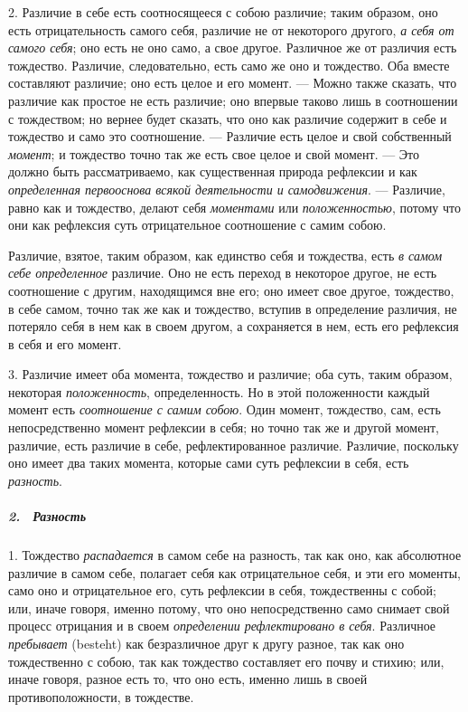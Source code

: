2. Различие в себе есть соотносящееся с собою различие; таким образом, оно
есть отрицательность самого себя, различие не от некоторого другого,
{\em а себя от самого себя}; оно есть не оно само, а
свое другое. Различное же от различия есть тождество. Различие,
следовательно, есть само же оно и тождество. Оба вместе составляют
различие; оно есть целое и его момент. — Можно также сказать, что различие
как простое не есть различие; оно впервые таково лишь в соотношении с
тождеством; но вернее будет сказать, что оно как различие содержит в себе и
тождество и само это соотношение. — Различие есть целое и свой собственный
{\em момент}; и тождество точно так же есть свое целое
и свой момент. — Это должно быть рассматриваемо, как существенная природа
рефлексии и как {\em определенная первооснова всякой
деятельности и самодвижения}. — Различие, равно как и тождество, делают
себя {\em моментами} или
{\em положенностью}, потому что они как рефлексия суть
отрицательное соотношение с самим собою.

Различие, взятое, таким образом, как единство себя и тождества, есть
{\em в самом себе определенное} различие. Оно не есть
переход в некоторое другое, не есть соотношение с другим, находящимся вне
его; оно имеет свое другое, тождество, в себе самом, точно так же как и
тождество, вступив в определение различия, не потеряло себя в нем как в
своем другом, а сохраняется в нем, есть его рефлексия в себя и его момент.

3. Различие имеет оба момента, тождество и различие; оба суть, таким
образом, некоторая {\em положенность}, определенность.
Но в этой положенности каждый момент есть
{\em соотношение с самим собою}. Один момент,
тождество, сам, есть непосредственно момент рефлексии в себя; но точно так
же и другой момент, различие, есть различие в себе, рефлектированное
различие. Различие, поскольку оно имеет два таких момента, которые сами
суть рефлексии в себя, есть {\em разность}.

\subparagraph[2. \ Разность]{2. \ Разность}
1. Тождество {\em распадается} в самом себе на разность, так как
оно, как абсолютное различие в самом себе, полагает себя как отрицательное
себя, и эти его моменты, само оно и отрицательное его, суть рефлексии в
себя, тождественны с собой; или, иначе говоря, именно потому, что оно
непосредственно само снимает свой процесс отрицания и в своем
{\em определении рефлектировано в себя}. Различное
{\em пребывает} (besteht) как безразличное друг к другу
разное, так как оно тождественно с собою, так как тождество составляет его
почву и стихию; или, иначе говоря, разное есть то, что оно есть, именно
лишь в своей противоположности, в тождестве.

